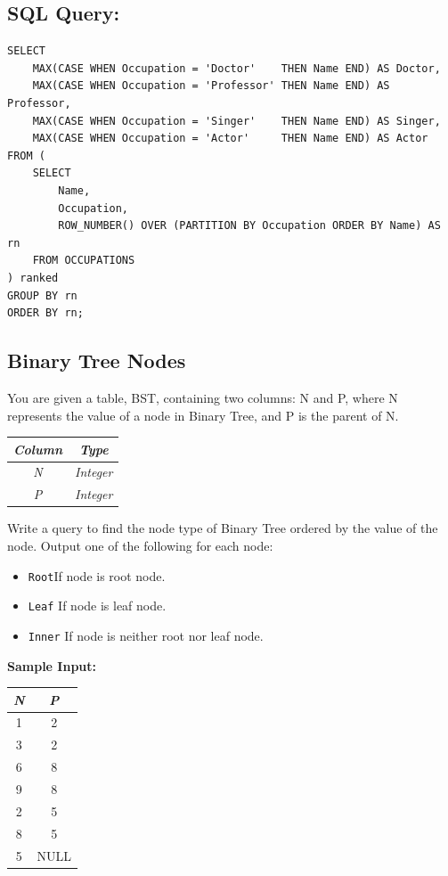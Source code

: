 \documentclass[12pt,a4paper]{article}
\renewcommand{\arraystretch}{1.5} %
\begin{document}
\subsection*{SQL Query: }
\begin{lstlisting}[style=sqlstyle]
SELECT
    MAX(CASE WHEN Occupation = 'Doctor'    THEN Name END) AS Doctor,
    MAX(CASE WHEN Occupation = 'Professor' THEN Name END) AS Professor,
    MAX(CASE WHEN Occupation = 'Singer'    THEN Name END) AS Singer,
    MAX(CASE WHEN Occupation = 'Actor'     THEN Name END) AS Actor
FROM (
    SELECT
        Name,
        Occupation,
        ROW_NUMBER() OVER (PARTITION BY Occupation ORDER BY Name) AS rn
    FROM OCCUPATIONS
) ranked
GROUP BY rn
ORDER BY rn;
\end{lstlisting}
\subsection{Binary Tree Nodes}
You are given a table, BST, containing two columns: N and P, where N represents the value of a node in Binary Tree, and P is the parent of N.
\begin{table}[H]
\centering
\renewcommand{\arraystretch}{1.3}
\begin{tabular}{|c|c|} \hline
\textit{Column} & \textit{Type} \\ \hline
\textit{N} & \textit{Integer} \\ \hline
\textit{P} & \textit{Integer} \\ \hline
\end{tabular}
\end{table}
Write a query to find the node type of Binary Tree ordered by the value of the node. Output one of the following for each node:
\begin{itemize}
    \item \texttt{Root}If node is root node.
    \item \texttt{Leaf} If node is leaf node.
    \item \texttt{Inner} If node is neither root nor leaf node.
\end{itemize}
\textbf{Sample Input:}
\begin{table}[H]
\centering
\renewcommand{\arraystretch}{1.3}
\begin{tabular}{|c|c|} \hline
\textit{N} & \textit{P} \\ \hline
1 & 2 \\ \hline
3 & 2 \\ \hline
6 & 8 \\ \hline
9 & 8 \\ \hline
2 & 5 \\ \hline
8 & 5 \\ \hline
5 & NULL \\ \hline
\end{tabular}
\end{table}
\end{document}
